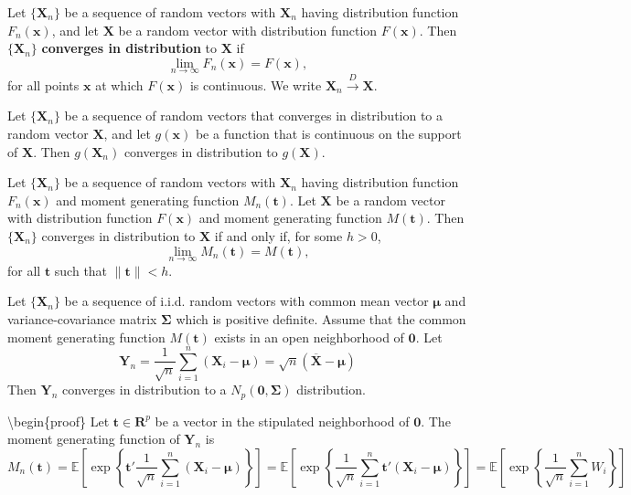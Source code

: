 \begin{definition}
Let $\{\mathbf{X}_n\}$ be a sequence of random vectors with $\mathbf{X}_n$ having distribution function $F_n(\mathbf{x})$, and let $\mathbf{X}$ be a random vector with distribution function $F(\mathbf{x})$. Then $\{\mathbf{X}_n\}$ \textbf{converges in distribution} to $\mathbf{X}$ if
\[
\lim_{n\rightarrow \infty}F_n(\mathbf{x})=F(\mathbf{x}),
\]for all points $\mathbf{x}$ at which $F(\mathbf{x})$ is continuous. We write $\mathbf{X}_n \xrightarrow{D} \mathbf{X}$.
\end{definition}
\begin{theorem}
Let $\{\mathbf{X}_n\}$ be a sequence of random vectors that converges in distribution to a random vector $\mathbf{X}$, and let $g(\mathbf{x})$ be a function that is continuous on the support of $\mathbf{X}$. Then $g(\mathbf{X}_n)$ converges in distribution to $g(\mathbf{X})$.
\end{theorem}
\begin{theorem}
Let $\{\mathbf{X}_n\}$ be a sequence of random vectors with $\mathbf{X}_n$ having distribution function $F_n(\mathbf{x})$ and moment generating function $M_n(\mathbf{t})$. Let $\mathbf{X}$ be a random vector with distribution function $F(\mathbf{x})$ and moment generating function $M(\mathbf{t})$. Then $\{\mathbf{X}_n\}$ converges in distribution to $\mathbf{X}$ if and only if, for some $h>0$,
\[
\lim_{n\rightarrow \infty}M_n(\mathbf{t})=M(\mathbf{t}),
\]for all $\mathbf{t}$ such that $\|\mathbf{t}\|<h$.
\end{theorem}
\begin{theorem}
Let $\{\mathbf{X}_n\}$ be a sequence of i.i.d. random vectors with common mean vector $\boldsymbol{\mu}$ and variance-covariance matrix $\boldsymbol{\Sigma}$ which is positive definite. Assume that the common moment generating function $M(\mathbf{t})$ exists in an open neighborhood of $\mathbf{0}$. Let
\[
\mathbf{Y}_n=\frac{1}{\sqrt{n}} \sum_{i=1}^n\left(\mathbf{X}_i-\boldsymbol{\mu}\right)=\sqrt{n}(\overline{\mathbf{X}}-\boldsymbol{\mu})
\]Then $\mathbf{Y}_n$ converges in distribution to a $N_p(\mathbf{0}, \boldsymbol{\Sigma})$ distribution.
\end{theorem}
\textbackslash{}begin\{proof\}
Let $\mathbf{t}\in \mathbf{R}^{p}$ be a vector in the stipulated neighborhood of $\mathbf{0}$. The moment generating function of $\mathbf{Y}_n$ is
\[
M_n(\mathbf{t})=\mathbb{E}\left[ \exp \left\{  \mathbf{t}'\frac{1}{\sqrt{ n }} \sum_{i=1}^{n} (\mathbf{X}_i-\boldsymbol{\mu})  \right\} \right]=\mathbb{E}\left[ \exp \left\{  \frac{1}{\sqrt{ n }} \sum_{i=1}^{n} \mathbf{t}'(\mathbf{X}_i-\boldsymbol{\mu})  \right\} \right]=\mathbb{E}\left[ \exp \left\{  \frac{1}{\sqrt{ n }} \sum_{i=1}^{n} W_i  \right\} \right]
\]
